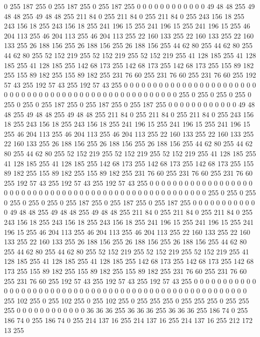 0 255 187 255 0 255 187 255 0 255 187 255 0 0 0 0 0 0 0 0 0 0 0 0 49 48 48 255 49 48 48 255 49 48 48 255 211 84 0 255 211 84 0 255 211 84 0 255 243 156 18 255 243 156 18 255 243 156 18 255 241 196 15 255
241 196 15 255 241 196 15 255 46 204 113 255 46 204 113 255 46 204 113 255 22 160 133 255 22 160 133 255 22 160 133 255 26 188 156 255 26 188 156 255 26 188 156 255 44 62 80 255 44 62 80 255 44 62 80 255 52 152 219 255 52 152 219 255
52 152 219 255 41 128 185 255 41 128 185 255 41 128 185 255 142 68 173 255 142 68 173 255 142 68 173 255 155 89 182 255 155 89 182 255 155 89 182 255 231 76 60 255 231 76 60 255 231 76 60 255 192 57 43 255 192 57 43 255 192 57 43 255
0 0 0 0 0 0 0 0 0 0 0 0 0 0 0 0 0 0 0 0 0 0 0 0 0 0 0 0 0 0 0 0 0 0 0 0 0 0 0 0 0 0 0 0 0 0 0 0 0 0 0 0 0 255 0 255 0 255 0 255 0 255 0 255
0 255 187 255 0 255 187 255 0 255 187 255 0 0 0 0 0 0 0 0 0 0 0 0 49 48 48 255 49 48 48 255 49 48 48 255 211 84 0 255 211 84 0 255 211 84 0 255 243 156 18 255 243 156 18 255 243 156 18 255 241 196 15 255
241 196 15 255 241 196 15 255 46 204 113 255 46 204 113 255 46 204 113 255 22 160 133 255 22 160 133 255 22 160 133 255 26 188 156 255 26 188 156 255 26 188 156 255 44 62 80 255 44 62 80 255 44 62 80 255 52 152 219 255 52 152 219 255
52 152 219 255 41 128 185 255 41 128 185 255 41 128 185 255 142 68 173 255 142 68 173 255 142 68 173 255 155 89 182 255 155 89 182 255 155 89 182 255 231 76 60 255 231 76 60 255 231 76 60 255 192 57 43 255 192 57 43 255 192 57 43 255
0 0 0 0 0 0 0 0 0 0 0 0 0 0 0 0 0 0 0 0 0 0 0 0 0 0 0 0 0 0 0 0 0 0 0 0 0 0 0 0 0 0 0 0 0 0 0 0 0 0 0 0 0 255 0 255 0 255 0 255 0 255 0 255
0 255 187 255 0 255 187 255 0 255 187 255 0 0 0 0 0 0 0 0 0 0 0 0 49 48 48 255 49 48 48 255 49 48 48 255 211 84 0 255 211 84 0 255 211 84 0 255 243 156 18 255 243 156 18 255 243 156 18 255 241 196 15 255
241 196 15 255 241 196 15 255 46 204 113 255 46 204 113 255 46 204 113 255 22 160 133 255 22 160 133 255 22 160 133 255 26 188 156 255 26 188 156 255 26 188 156 255 44 62 80 255 44 62 80 255 44 62 80 255 52 152 219 255 52 152 219 255
52 152 219 255 41 128 185 255 41 128 185 255 41 128 185 255 142 68 173 255 142 68 173 255 142 68 173 255 155 89 182 255 155 89 182 255 155 89 182 255 231 76 60 255 231 76 60 255 231 76 60 255 192 57 43 255 192 57 43 255 192 57 43 255
0 0 0 0 0 0 0 0 0 0 0 0 0 0 0 0 0 0 0 0 0 0 0 0 0 0 0 0 0 0 0 0 0 0 0 0 0 0 0 0 0 0 0 0 0 0 0 0 0 0 0 0 0 255 102 255 0 255 102 255 0 255 102 255
0 255 255 255 0 255 255 255 0 255 255 255 0 0 0 0 0 0 0 0 0 0 0 0 36 36 36 255 36 36 36 255 36 36 36 255 186 74 0 255 186 74 0 255 186 74 0 255 214 137 16 255 214 137 16 255 214 137 16 255 212 172 13 255
